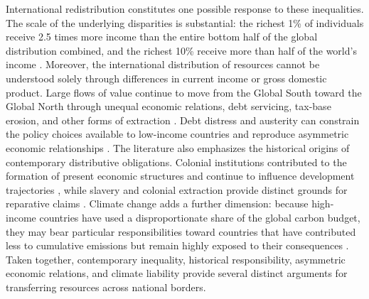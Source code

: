 \documentclass[11pt,a4paper]{article}
\begin{document}
International redistribution constitutes one possible response to these inequalities. %
The scale of the underlying disparities is substantial: the richest 1\% of individuals %
receive 
2.5 times %
more income than the entire bottom half of the global distribution combined, 
and the richest 10\% receive more than half of the world's income %
\citep{chancel_world_2026}.  %
Moreover, the international distribution of resources cannot be understood solely through differences in current income or gross domestic product. Large flows of value continue to move from the Global South toward the Global North through unequal economic relations, debt servicing, tax-base erosion, and other forms of extraction \citep{hickel_plunder_2021}. Debt distress and austerity can constrain the policy choices available to low-income countries and reproduce asymmetric economic relationships \citep{fischer_return_2023}. The literature also emphasizes the historical origins of contemporary distributive obligations. Colonial institutions contributed to the formation of present economic structures and continue to influence development trajectories \citep{bhambra_colonial_2021}, while slavery and colonial extraction provide distinct grounds for reparative claims \citep{solbiac_britains_2015,darity_cumulative_2022}. Climate change adds a further dimension: because high-income countries have used a disproportionate share of the global carbon budget, they may bear particular responsibilities toward countries that have contributed less to cumulative emissions but remain highly exposed to their consequences \citep{fanning_compensation_2023}. %
Taken together, contemporary inequality, historical responsibility, asymmetric economic relations, and climate liability provide several distinct arguments for transferring resources across national borders.
\end{document}
